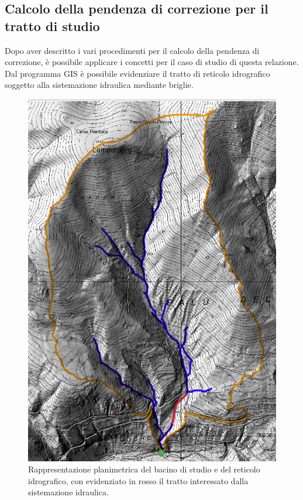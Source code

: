 \subsection{Calcolo della pendenza di correzione per il tratto di studio}
Dopo aver descritto i vari procedimenti per il calcolo della pendenza di correzione, è possibile applicare i concetti per il caso di studio di questa relazione.\\
Dal programma GIS è possibile evidenziare il tratto di reticolo idrografico soggetto alla sistemazione idraulica mediante briglie.
\begin{figure}[H] \centering
    \includegraphics[scale=0.3]{immagini/pendenza_planimetria_1.png}
    \caption{Rappresentazione planimetrica del bacino di studio e del reticolo idrografico, con evidenziato in rosso il tratto interessato dalla sistemazione idraulica.}
    \label{pendenza_planimetria_1}
\end{figure}

